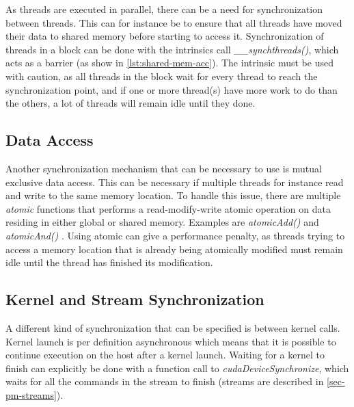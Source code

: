 As threads are executed in parallel, there can be a need for synchronization between threads.
This can for instance be to ensure that all threads have moved their data to shared memory before starting to access it.
Synchronization of threads in a block can be done with the intrinsics call \textit{\_\_synchthreads()}, which acts as a barrier (as show in \autoref{lst:shared-mem-acc}).
The intrinsic must be used with caution, as all threads in the block wait for every thread to reach the synchronization point, and if one or more thread(s) have more work to do than the others, a lot of threads will remain idle until they done.

\subsection{Data Access}
Another synchronization mechanism that can be necessary to use is mutual exclusive data access.
This can be necessary if multiple threads for instance read and write to the same memory location.
To handle this issue, there are multiple \textit{atomic} functions that performs a read-modify-write atomic operation on data residing in either global or shared memory.
Examples are \textit{atomicAdd()} and \textit{atomicAnd()} \cite{cuda:programmingguide}.
Using atomic can give a performance penalty, as threads trying to access a memory location that is already being atomically modified must remain idle until the thread has finished its modification.

\subsection{Kernel and Stream Synchronization}
A different kind of synchronization that can be specified is between kernel calls.
Kernel launch is per definition asynchronous which means that it is possible to continue execution on the host after a kernel launch.
Waiting for a kernel to finish can explicitly be done with a function call to \textit{cudaDeviceSynchronize}, which waits for all the commands in the stream to finish (streams are described in \autoref{sec-pm-streams}).


